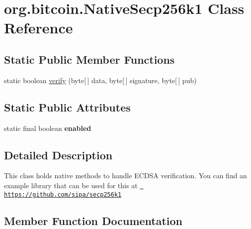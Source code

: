 \hypertarget{classorg_1_1bitcoin_1_1_native_secp256k1}{}\section{org.\+bitcoin.\+Native\+Secp256k1 Class Reference}
\label{classorg_1_1bitcoin_1_1_native_secp256k1}
\subsection*{Static Public Member Functions}
\begin{DoxyCompactItemize}
\item 
static boolean \mbox{\hyperlink{classorg_1_1bitcoin_1_1_native_secp256k1_a7ff9dbab59c8cff4ce489651f045cd0a}{verify}} (byte\mbox{[}$\,$\mbox{]} data, byte\mbox{[}$\,$\mbox{]} signature, byte\mbox{[}$\,$\mbox{]} pub)
\end{DoxyCompactItemize}
\subsection*{Static Public Attributes}
\begin{DoxyCompactItemize}
\item 
\mbox{\label{classorg_1_1bitcoin_1_1_native_secp256k1_a52e69585bc6f643505a508812f566a7d}} 
static final boolean {\bfseries enabled}
\end{DoxyCompactItemize}


\subsection{Detailed Description}
This class holds native methods to handle E\+C\+D\+SA verification. You can find an example library that can be used for this at \href{https://github.com/sipa/secp256k1}{\texttt{ https\+://github.\+com/sipa/secp256k1}} 

\subsection{Member Function Documentation}
\mbox{\label{classorg_1_1bitcoin_1_1_native_secp256k1_a7ff9dbab59c8cff4ce489651f045cd0a}} 
